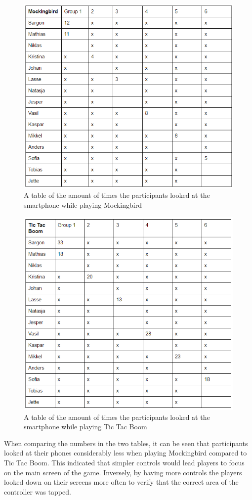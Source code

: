 \begin{figure}
\centering
\includegraphics[width=\textwidth]{figures/birdTable} 
\caption{A table of the amount of times the participants looked at the smartphone while playing Mockingbird}\label{fig:birdTable}
\end{figure}

\begin{figure}
\centering
\includegraphics[width=\textwidth]{figures/TTBtable} 
\caption{A table of the amount of times the participants looked at the smartphone while playing Tic Tac Boom}\label{fig:TTBtable}
\end{figure}

When comparing the numbers in the two tables, it can be seen that participants looked at their phones considerably less when playing Mockingbird compared to Tic Tac Boom. This indicated that simpler controls would lead players to focus on the main screen of the game. Inversely, by having more controls the players looked down on their screens more often to verify that the correct area of the controller was tapped. 
